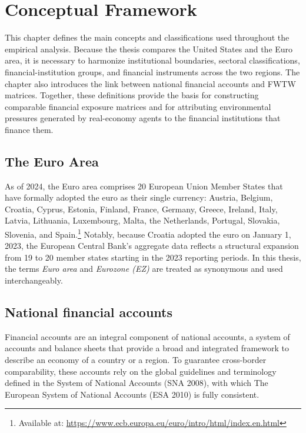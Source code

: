 
\chapter{Conceptual Framework}

This chapter defines the main concepts and classifications used throughout the empirical analysis. Because the thesis compares the United States and the Euro area, it is necessary to harmonize institutional boundaries, sectoral classifications, financial-institution groups, and financial instruments across the two regions. The chapter also introduces the link between national financial accounts and FWTW matrices. Together, these definitions provide the basis for constructing comparable financial exposure matrices and for attributing environmental pressures generated by real-economy agents to the financial institutions that finance them.

\section{The Euro Area}

As of 2024, the Euro area comprises 20 European Union Member States that have formally adopted the euro as their single currency: Austria, Belgium, Croatia, Cyprus, Estonia, Finland, France, Germany, Greece, Ireland, Italy, Latvia, Lithuania, Luxembourg, Malta, the Netherlands, Portugal, Slovakia, Slovenia, and Spain.\footnote{Available at: \url{https://www.ecb.europa.eu/euro/intro/html/index.en.html}} Notably, because Croatia adopted the euro on January 1, 2023, the European Central Bank's aggregate data reflects a structural expansion from 19 to 20 member states starting in the 2023 reporting periods. In this thesis, the terms \textit{Euro area} and \textit{Eurozone (EZ)} are treated as synonymous and used interchangeably.

\section{National financial accounts}

Financial accounts are an integral component of national accounts, a system of accounts and balance sheets that provide a broad and integrated framework to describe an economy of a country or a region. To guarantee cross-border comparability, these accounts rely on the global guidelines and terminology defined in the System of National Accounts (SNA 2008), with which The European System of National Accounts (ESA 2010) is fully consistent.


